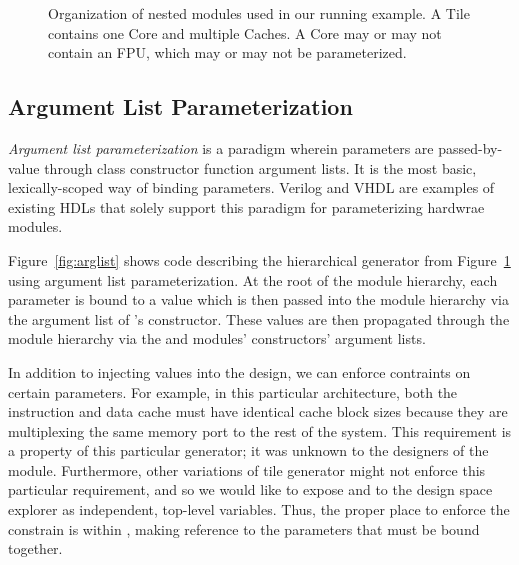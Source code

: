 \begin{figure}
\centering
{}
\caption{Organization of nested modules used in our running example.
A Tile contains one Core and multiple Caches.
A Core may or may not contain an FPU, which may or may not be parameterized.}
\label{fig:block}
\end{figure}

\subsection{Argument List Parameterization}

\emph{Argument list parameterization} is a paradigm wherein parameters are passed-by-value through class constructor function argument lists. 
It is the most basic, lexically-scoped way of binding parameters.
Verilog and VHDL are examples of existing HDLs that solely support this paradigm for parameterizing hardwrae modules.
 
Figure~\ref{fig:arglist} shows code describing the hierarchical  generator from Figure~\ref{fig:block} using argument list parameterization.
At the root of the module hierarchy, each parameter is bound to a value which is then passed into the module hierarchy via the argument list of 's constructor.
These values are then propagated through the module hierarchy via the  and  modules' constructors' argument lists.

In addition to injecting values into the design, we can enforce contraints on certain parameters.
For example, in this particular  architecture, both the instruction and data cache must have identical cache block sizes
because they are multiplexing the same memory port to the rest of the system.
This requirement is a property of this particular  generator; it was unknown to the designers of the  module.
Furthermore, other variations of tile generator might not enforce this particular requirement, and so we would like to expose
 and  to the design space explorer as independent, top-level variables.
Thus, the proper place to enforce the constrain is within , making reference to the parameters that must be bound together.

